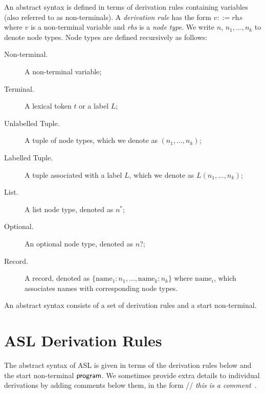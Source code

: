 \documentclass{book}
\begin{document}
An abstract syntax is defined in terms of derivation rules containing variables (also referred to as non-terminals).
%
A \emph{derivation rule} has the form $v ::= \textit{rhs}$ where $v$ is a non-terminal variable and \textit{rhs} is a \emph{node type}. We write $n$, $n_1,\ldots,n_k$ to denote node types.
%
Node types are defined recursively as follows:
\begin{description}
\item[Non-terminal.] A non-terminal variable;
\item[Terminal.] A lexical token $t$ or a label $L$;
\item[Unlabelled Tuple.] A tuple of node types, which we denote as $(n_1,\ldots,n_k)$;
\item[Labelled Tuple.] A tuple associated with a label $L$, which we denote as $L(n_1,\ldots,n_k)$;
\item[List.] A list node type, denoted as $n^{*}$;
\item[Optional.] An optional node type, denoted as $n?$;
\item[Record.] A record, denoted as $\{\text{name}_1 : n_1,\ldots,\text{name}_k : n_k\}$ where $\text{name}_i$, which associates names with corresponding node types.
\end{description}

An abstract syntax consists of a set of derivation rules and a start non-terminal.

\newcommand\ASTComment[1]{// \textit{#1}\ }

\section{ASL Derivation Rules}

The abstract syntax of ASL is given in terms of the derivation rules below and the start non-terminal $\textsf{program}$.
%
We sometimes provide extra details to individual derivations by adding comments below them, in the form \ASTComment{this is a comment}.
\end{document}
